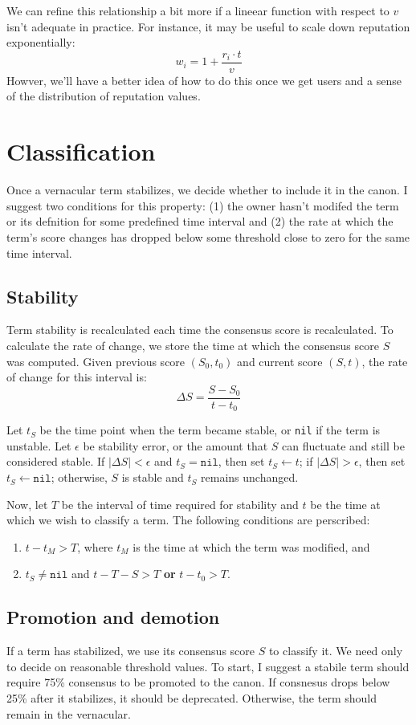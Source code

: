 \documentclass[letter]{article}
\begin{document}
We can refine this relationship a bit more if a lineear function with respect to $v$ isn't adequate
in practice. For instance, it may be useful to scale down reputation exponentially: 
$$ w_i = 1 + \frac{r_i \cdot t}{v} $$
Howver, we'll have a better idea of how to do this once we get users and a sense of the distribution 
of reputation values. 

\section{Classification}
Once a vernacular term stabilizes, we decide whether to include it in the canon. I suggest two 
conditions for this property: (1) the owner hasn't modifed the term or its defnition for some 
predefined time interval and (2) the rate at which the term's score changes has dropped below some
threshold close to zero for the same time interval. 

\subsection{Stability}
Term stability is recalculated each time the consensus score is recalculated. 
To calculate the rate of change, we store the time at which the consensus score $S$ was computed. 
Given previous score $(S_0, t_0)$ and current score $(S, t)$, the rate of change for this 
interval is: 
$$ \Delta S = \frac{S - S_0}{t - t_0} $$

Let $t_S$ be the time point when the term became stable, or \texttt{nil} if the term is unstable. 
Let $\epsilon $ be stability error, or the amount that $S$ can fluctuate and still be considered 
stable. If $| \Delta S | < \epsilon $ and $t_S = \texttt{nil}$, then set $t_S \leftarrow t$; 
if $| \Delta S | > \epsilon$, then set $t_S \leftarrow \texttt{nil}$; otherwise, $S$ is 
stable and $t_S$ remains unchanged.

Now, let $T$ be the interval of time required for stability and $t$ be the time at which we 
wish to classify a term. The following conditions are perscribed: 
\begin{enumerate}
\item $t - t_M > T$, where $t_M$ is the time at which the term was modified, and 
\item $t_S \ne \texttt{nil}$ and $t - T-S > T$ \textbf{or} $t - t_0 > T$.
\end{enumerate}

\subsection{Promotion and demotion}
If a term has stabilized, we use its consensus score $S$ to classify it. 
We need only to decide on reasonable threshold values. To start, I suggest a stabile term should 
require 75\% consensus to be promoted to the canon. If consnesus drops below 25\% after it stabilizes, 
it should be deprecated. Otherwise, the term should remain in the vernacular. 
\end{document}
